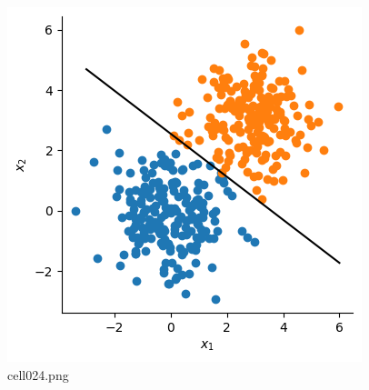 \begin{figure}[ht]
	\centering
	\includegraphics[scale=0.8, max width=\linewidth]{./fig/local-learning-rule/logistic-regression-perceptron/cell024.png}
	\caption{cell024.png}
	\label{cell024.png}
\end{figure}
